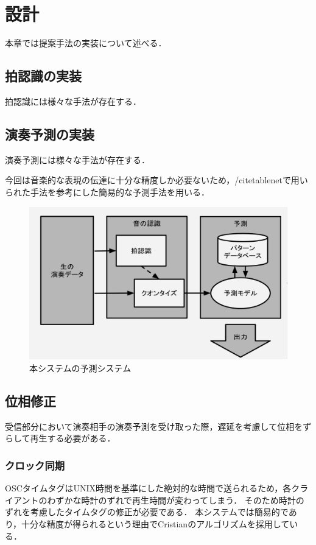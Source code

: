 \chapter{設計}
\label{implementation}

本章では提案手法の実装について述べる．

\section{拍認識の実装}
拍認識には様々な手法が存在する．

\section{演奏予測の実装}
演奏予測には様々な手法が存在する．

今回は音楽的な表現の伝達に十分な精度しか必要ないため，/cite{tablenet}で用いられた手法を参考にした簡易的な予測手法を用いる．

\begin{figure}[htbp]
  \centering
  \includegraphics[width=0.8\linewidth]{src/pred.png}
  \caption{本システムの予測システム}
  \label{fig:tablenet}
\end{figure}

\section{位相修正}
受信部分において演奏相手の演奏予測を受け取った際，遅延を考慮して位相をずらして再生する必要がある．

\subsection{クロック同期}
OSCタイムタグはUNIX時間を基準にした絶対的な時間で送られるため，各クライアントのわずかな時計のずれで再生時間が変わってしまう．
そのため時計のずれを考慮したタイムタグの修正が必要である．
本システムでは簡易的であり，十分な精度が得られるという理由でCristianのアルゴリズム\cite{cristian}を採用している．


